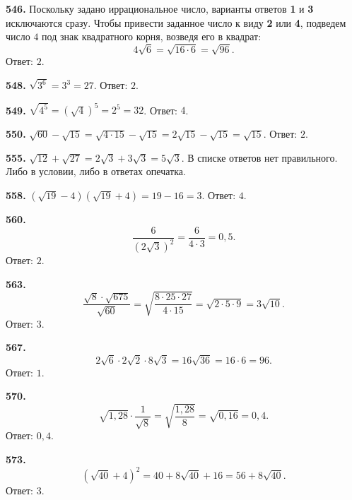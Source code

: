 \textbf{546.} Поскольку задано иррациональное число, варианты ответов \textbf{1} и \textbf{3} исключаются сразу. Чтобы привести заданное число к виду \textbf{2} или \textbf{4}, подведем число $4$ под знак квадратного корня, возведя его в квадрат: $$4\sqrt{6}=\sqrt{16\cdot6}=\sqrt{96}.$$ \newline \null \hspace*{\fill} Ответ: $2$. 

\textbf{548.} $\sqrt{3^6}=3^3=27$. \newline \null \hspace*{\fill} Ответ: $2$. 

\textbf{549.} $\sqrt{4^5}=\left(\sqrt{4}\right)^5=2^5=32$. \newline \null \hspace*{\fill} Ответ: $4$. 

\textbf{550.} $\sqrt{60}-\sqrt{15}=\sqrt{4\cdot15}-\sqrt{15}=2\sqrt{15}-\sqrt{15}=\sqrt{15}$. \newline \null \hspace*{\fill} Ответ: $2$. 

\textbf{555.} $\sqrt{12}+\sqrt{27}=2\sqrt{3}+3\sqrt{3}=5\sqrt{3}$. В списке ответов нет правильного. Либо в условии, либо в ответах опечатка.

\textbf{558.} $\left(\sqrt{19}-4\right)\left(\sqrt{19}+4\right)=19-16=3$. \newline \null \hspace*{\fill} Ответ: $4$. 

\textbf{560.} $$\frac{6}{\left(2\sqrt{3}\right)^2}=\frac{6}{4\cdot3}=0,5.$$ \newline \null \hspace*{\fill} Ответ: $2$. 

\textbf{563.} $$\frac{\sqrt8\cdot\sqrt{675}}{\sqrt{60}}=\sqrt{\frac{8\cdot25\cdot27}{4\cdot15}}=\sqrt{2\cdot5\cdot9}=3\sqrt{10}.$$ \newline \null \hspace*{\fill} Ответ: $3$.

\textbf{567.} $$2\sqrt6\cdot2\sqrt2\cdot8\sqrt3=16\sqrt{36}=16\cdot6=96.$$ \newline \null \hspace*{\fill} Ответ: $1$.

\textbf{570.} $$\sqrt{1,28}\cdot\frac{1}{\sqrt8}=\sqrt{\frac{1,28}{8}}=\sqrt{0,16}=0,4.$$ \newline \null \hspace*{\fill} Ответ: $0,4$.

\textbf{573.} $$\left(\sqrt{40}+4\right)^2=40+8\sqrt{40}+16=56+8\sqrt{40}.$$ \newline \null \hspace*{\fill} Ответ: $3$.


